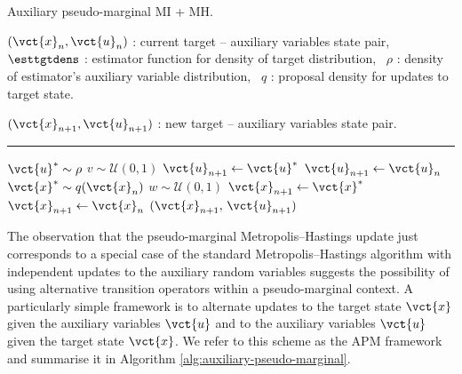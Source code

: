 \begin{algorithm}[!t]
\caption{Auxiliary pseudo-marginal MI + MH.}
\label{alg:auxiliary-pseudo-marginal-mi-mh}
\begin{algorithmic}
\small
    \Require
    $(\vct{x}_n, \vct{u}_n)$ : current target -- auxiliary variables state pair,~
    $\esttgtdens$ : estimator function for density of target distribution,~
    $\rho$ : density of estimator's auxiliary variable distribution,~
    $q$ : proposal density for updates to target state.
    \Ensure\raggedright
    $(\vct{x}_{n+1}, \vct{u}_{n+1})$ : new target -- auxiliary variables state pair.
\end{algorithmic}
\hrule
\small
\begin{algorithmic}[1]
  \State $\vct{u}^* \sim \rho$ 
  \State $v \sim \mathcal{U}(0,1)$
    \State $\vct{u}_{n+1} \gets \vct{u}^*$
  \Else
    \State $\vct{u}_{n+1} \gets \vct{u}_n$
  \EndIf
  \State $\vct{x}^* \sim q(\vct{x}_n)$ 
  \State $w \sim \mathcal{U}(0,1)$
    \State $\vct{x}_{n+1} \gets \vct{x}^*$
  \Else
    \State  $\vct{x}_{n+1} \gets \vct{x}_n$
  \EndIf
  \State \Return $(\vct{x}_{n+1},\,\vct{u}_{n+1})$
\end{algorithmic}
\end{algorithm}

The observation that the pseudo-marginal Metropolis--Hastings update just corresponds to a special case of the standard Metropolis--Hastings algorithm with independent updates to the auxiliary random variables suggests the possibility of using alternative transition operators within a pseudo-marginal context. A particularly simple framework is to alternate updates to the target state $\vct{x}$ given the auxiliary variables $\vct{u}$ and to the auxiliary variables $\vct{u}$ given the target state $\vct{x}$. We refer to this scheme as the \ac{APM} framework and summarise it in Algorithm \ref{alg:auxiliary-pseudo-marginal}.

